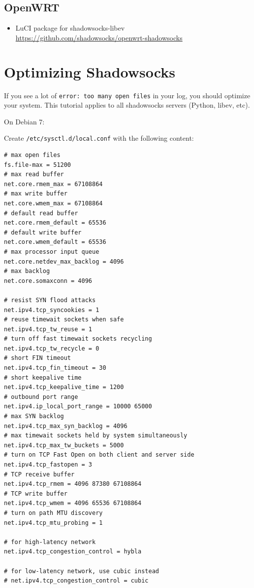 \documentclass[11pt,a4paper]{sphinxmanual}
\begin{document}
\section{OpenWRT}
\label{sec-3-6}
\begin{itemize}
\item LuCI package for shadowsocks-libev \href{https://github.com/shadowsocks/openwrt-shadowsocks}{\url{https://github.com/shadowsocks/openwrt-shadowsocks}}
\end{itemize}


\label{sec:optimizing_shadowsocks}
\chapter{Optimizing Shadowsocks}
\label{sec-4}
If you see a lot of \verb~error: too many open files~ in your log, you should optimize your system. This tutorial applies to all shadowsocks servers (Python, libev, etc).

On Debian 7:

Create \verb~/etc/sysctl.d/local.conf~ with the following content:

\begin{Verbatim}
# max open files
fs.file-max = 51200
# max read buffer
net.core.rmem_max = 67108864
# max write buffer
net.core.wmem_max = 67108864
# default read buffer
net.core.rmem_default = 65536
# default write buffer
net.core.wmem_default = 65536
# max processor input queue
net.core.netdev_max_backlog = 4096
# max backlog
net.core.somaxconn = 4096

# resist SYN flood attacks
net.ipv4.tcp_syncookies = 1
# reuse timewait sockets when safe
net.ipv4.tcp_tw_reuse = 1
# turn off fast timewait sockets recycling
net.ipv4.tcp_tw_recycle = 0
# short FIN timeout
net.ipv4.tcp_fin_timeout = 30
# short keepalive time
net.ipv4.tcp_keepalive_time = 1200
# outbound port range
net.ipv4.ip_local_port_range = 10000 65000
# max SYN backlog
net.ipv4.tcp_max_syn_backlog = 4096
# max timewait sockets held by system simultaneously
net.ipv4.tcp_max_tw_buckets = 5000
# turn on TCP Fast Open on both client and server side
net.ipv4.tcp_fastopen = 3
# TCP receive buffer
net.ipv4.tcp_rmem = 4096 87380 67108864
# TCP write buffer
net.ipv4.tcp_wmem = 4096 65536 67108864
# turn on path MTU discovery
net.ipv4.tcp_mtu_probing = 1

# for high-latency network
net.ipv4.tcp_congestion_control = hybla

# for low-latency network, use cubic instead
# net.ipv4.tcp_congestion_control = cubic
\end{Verbatim}
\end{document}
